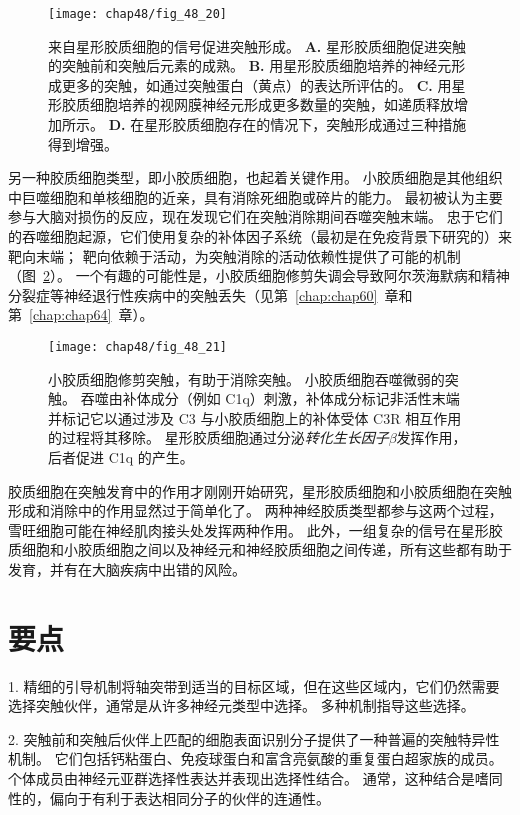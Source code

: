 \begin{figure}[htbp]
	\centering
	\texttt{[image: chap48/fig\_48\_20]}
	\caption{来自星形胶质细胞的信号促进突触形成。
		\textbf{A.} 星形胶质细胞促进突触的突触前和突触后元素的成熟。
		\textbf{B.} 用星形胶质细胞培养的神经元形成更多的突触，如通过突触蛋白（黄点）的表达所评估的。
		\textbf{C.} 用星形胶质细胞培养的视网膜神经元形成更多数量的突触，如递质释放增加所示。
		\textbf{D.} 在星形胶质细胞存在的情况下，突触形成通过三种措施得到增强。}
	\label{fig:48_20}
\end{figure}


另一种胶质细胞类型，即小胶质细胞，也起着关键作用。
小胶质细胞是其他组织中巨噬细胞和单核细胞的近亲，具有消除死细胞或碎片的能力。
最初被认为主要参与大脑对损伤的反应，现在发现它们在突触消除期间吞噬突触末端。
忠于它们的吞噬细胞起源，它们使用复杂的补体因子系统（最初是在免疫背景下研究的）来靶向末端；
靶向依赖于活动，为突触消除的活动依赖性提供了可能的机制（图~\ref{fig:48_21}）。
一个有趣的可能性是，小胶质细胞修剪失调会导致阿尔茨海默病和精神分裂症等神经退行性疾病中的突触丢失（见第~\ref{chap:chap60}~章和第~\ref{chap:chap64}~章）。


\begin{figure}[htbp]
	\centering
	\texttt{[image: chap48/fig\_48\_21]}
	\caption{小胶质细胞修剪突触，有助于消除突触。
		小胶质细胞吞噬微弱的突触。
		吞噬由补体成分（例如 C1q）刺激，补体成分标记非活性末端并标记它以通过涉及 C3 与小胶质细胞上的补体受体 C3R 相互作用的过程将其移除。
		星形胶质细胞通过分泌\textit{转化生长因子$\beta$}发挥作用，后者促进 C1q 的产生\cite{allen2014astrocyte}。}
	\label{fig:48_21}
\end{figure}


胶质细胞在突触发育中的作用才刚刚开始研究，星形胶质细胞和小胶质细胞在突触形成和消除中的作用显然过于简单化了。
两种神经胶质类型都参与这两个过程，雪旺细胞可能在神经肌肉接头处发挥两种作用。
此外，一组复杂的信号在星形胶质细胞和小胶质细胞之间以及神经元和神经胶质细胞之间传递，所有这些都有助于发育，并有在大脑疾病中出错的风险。



\section{要点}

1. 精细的引导机制将轴突带到适当的目标区域，但在这些区域内，它们仍然需要选择突触伙伴，通常是从许多神经元类型中选择。
多种机制指导这些选择。


2. 突触前和突触后伙伴上匹配的细胞表面识别分子提供了一种普遍的突触特异性机制。
它们包括钙粘蛋白、免疫球蛋白和富含亮氨酸的重复蛋白超家族的成员。
个体成员由神经元亚群选择性表达并表现出选择性结合。
通常，这种结合是嗜同性的，偏向于有利于表达相同分子的伙伴的连通性。


